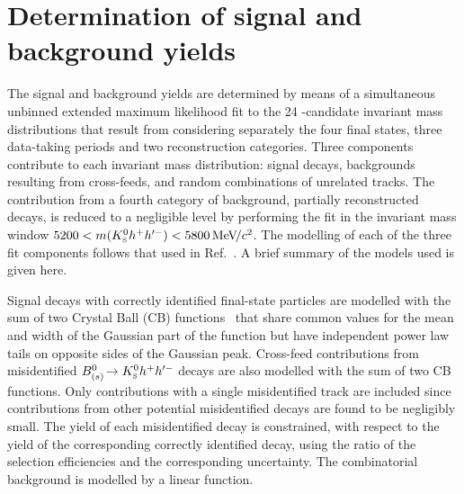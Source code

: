 \section{Determination of signal and background yields}
\label{sec:dataset}

The signal and background yields are determined by means of a simultaneous
unbinned extended maximum likelihood fit to the 24 \B-candidate invariant
mass distributions that result from considering separately the four final
states, three data-taking periods and two \KS reconstruction categories.
Three components contribute to each invariant mass distribution:
signal decays, backgrounds resulting from cross-feeds, and random
combinations of unrelated tracks.
The contribution from a fourth category of background, partially
reconstructed decays, is reduced to a negligible level by performing the
fit in the invariant mass window $5200 < m({{K}^0_{\mathrm{ \scriptscriptstyle S}}} h^+ h^{\prime-}) < 5800{\mathrm{\,Me\kern -0.1em V\!/}c^2}$.
The modelling of each of the three fit components follows that used in
Ref.~\cite{LHCb-PAPER-2017-010}.
A brief summary of the models used is given here.

Signal decays with correctly identified final-state particles are
modelled with the sum of two Crystal Ball (CB)
functions~\cite{Skwarnicki:1986xj} that share common values for the mean
and width of the Gaussian part of the function but have independent power
law tails on opposite sides of the Gaussian peak.
Cross-feed contributions from misidentified ${{B}^0_{({s})}}\!\rightarrow {\ensuremath{{K}^0_{\mathrm{ \scriptscriptstyle S}}}} h^+ h^{\prime-}$ decays are also modelled with the sum of two CB functions.
Only contributions with a single misidentified track are included since contributions from other potential misidentified decays are found to be negligibly small.
The yield of each misidentified decay is constrained, with respect to the
yield of the corresponding correctly identified decay, using the ratio of
the selection efficiencies and the corresponding uncertainty.
The combinatorial background is modelled by a linear function.

